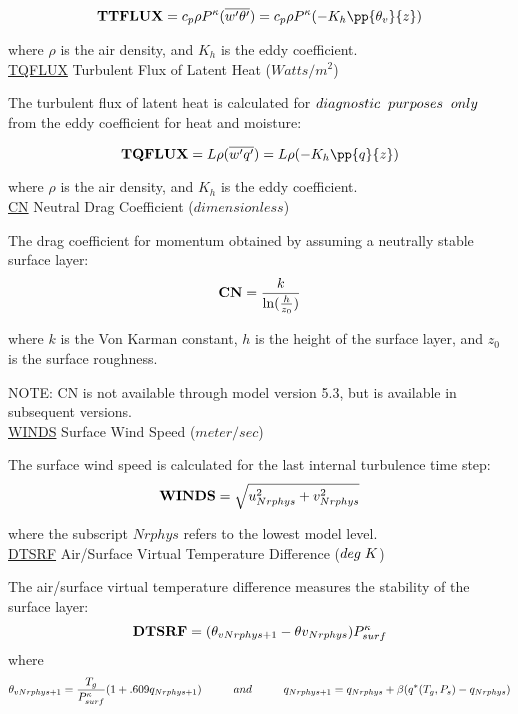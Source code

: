 \noindent
\[
{\bf TTFLUX} = c_p {\rho }  
P^{\kappa}{(\overline{w^{\prime}\theta^{\prime}})}
 = c_p  {\rho } P^{\kappa}{(- K_h \pp{\theta_v}{z})}
\]
 
\noindent
where $\rho$ is the air density, and $K_h$ is the eddy coefficient.
\\


\noindent
{ \underline {TQFLUX}  Turbulent Flux of Latent Heat ($Watts/m^2$) }

\noindent
The turbulent flux of latent heat is calculated for $diagnostic \hspace{.2cm} purposes 
\hspace{.2cm} only$ from the eddy coefficient for heat and moisture:

\noindent
\[
{\bf TQFLUX} = {L {\rho } (\overline{w^{\prime}q^{\prime}})} = 
{L {\rho }(- K_h \pp{q}{z})}
\]
 
\noindent
where $\rho$ is the air density, and $K_h$ is the eddy coefficient.
\\

 
\noindent
{ \underline {CN}  Neutral Drag Coefficient ($dimensionless$) }

\noindent
The drag coefficient for momentum obtained by assuming a neutrally stable surface layer:
\[
{\bf CN} = { k \over { \ln({h \over {z_0}})} }
\]

\noindent
where $k$ is the Von Karman constant, $h$ is the height of the surface layer, and
$z_0$ is the surface roughness. 

\noindent
NOTE: CN is not available through model version 5.3, but is available in subsequent
versions.
\\

\noindent
{ \underline {WINDS}  Surface Wind Speed ($meter/sec$) }

\noindent
The surface wind speed is calculated for the last internal turbulence time step:
\[
{\bf WINDS} = \sqrt{u_{Nrphys}^2 + v_{Nrphys}^2}
\]

\noindent
where the subscript $Nrphys$ refers to the lowest model level.
\\
 
\noindent
{ \underline {DTSRF}  Air/Surface Virtual Temperature Difference ($deg \hspace{.1cm} K$) }

\noindent
The air/surface virtual temperature difference measures the stability of the surface layer:
\[
{\bf DTSRF} = (\theta_{v{Nrphys+1}} - \theta{v_{Nrphys}}) P^{\kappa}_{surf}
\]
\noindent
where
\[
\theta_{v{Nrphys+1}} = { T_g \over {P^{\kappa}_{surf}} } (1 + .609 q_{Nrphys+1}) \hspace{1cm}
and \hspace{1cm} q_{Nrphys+1} = q_{Nrphys} + \beta(q^*(T_g,P_s) - q_{Nrphys})
\]

